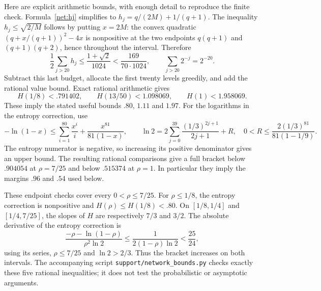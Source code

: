 Here are explicit arithmetic bounds, with enough detail to reproduce the finite check. Formula~\eqref{net:hj} simplifies to $h_j=q/(2M)+1/(q+1)$. The inequality $h_j\le\sqrt{2/M}$ follows by putting $x=2M$: the convex quadratic $(q+x/(q+1))^2-4x$ is nonpositive at the two endpoints $q(q+1)$ and $(q+1)(q+2)$, hence throughout the interval. Therefore
\[
 \frac12\sum_{j>20}h_j\le\frac{1+\sqrt2}{1024}
 <\frac{169}{70\cdot1024},
 \qquad \sum_{j>20}2^{-j}=2^{-20}.
\]
Subtract this last budget, allocate the first twenty levels greedily, and add the rational value bound. Exact rational arithmetic gives
\[
 H(1/8)<.791402,\qquad H(13/50)<1.098069,
 \qquad H(1)<1.958069.
\]
These imply the stated useful bounds $.80$, $1.11$ and $1.97$.
For the logarithms in the entropy correction, use
\[
 -\ln(1-x)\le\sum_{i=1}^{80}\frac{x^i}{i}
       +\frac{x^{81}}{81(1-x)},\qquad
 \ln2=2\sum_{j=0}^{39}\frac{(1/3)^{2j+1}}{2j+1}+R,
 \quad 0<R\le\frac{2(1/3)^{81}}{81(1-1/9)}.
\]
The entropy numerator is negative, so increasing its positive denominator gives an upper bound. The resulting rational comparisons give a full bracket below $.904054$ at $\rho=7/25$ and below $.515374$ at $\rho=1$. In particular they imply the margins $.96$ and $.54$ used below.

These endpoint checks cover every $0<\rho\le7/25$. For $\rho\le1/8$, the entropy correction is nonpositive and $H(\rho)\le H(1/8)<.80$. On $[1/8,1/4]$ and $[1/4,7/25]$, the slopes of $H$ are respectively $7/3$ and $3/2$. The absolute derivative of the entropy correction is
\[
 \frac{-\rho-\ln(1-\rho)}{\rho^2\ln2}
 \le\frac1{2(1-\rho)\ln2}<\frac{25}{24},
\]
using its series, $\rho\le7/25$ and $\ln2>2/3$. Thus the bracket increases on both intervals. The accompanying script \texttt{support/network\_bounds.py} checks exactly these five rational inequalities; it does not test the probabilistic or asymptotic arguments.

